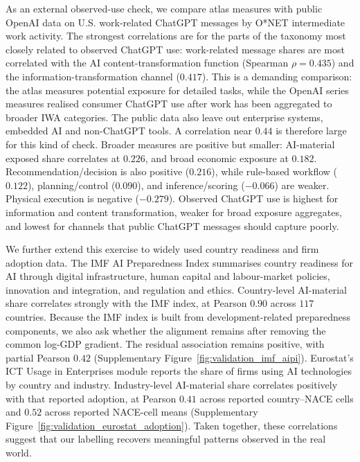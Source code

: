 \documentclass[11pt]{article}
\begin{document}
As an external observed-use check, we compare atlas measures with public OpenAI data on U.S. work-related ChatGPT messages by O*NET intermediate work activity. The strongest correlations are for the parts of the taxonomy most closely related to observed ChatGPT use: work-related message shares are most correlated with the AI content-transformation function (Spearman $\rho=0.435$) and the information-transformation channel ($0.417$). This is a demanding comparison: the atlas measures potential exposure for detailed tasks, while the OpenAI series measures realised consumer ChatGPT use after work has been aggregated to broader IWA categories. The public data also leave out enterprise systems, embedded AI and non-ChatGPT tools. A correlation near $0.44$ is therefore large for this kind of check. Broader measures are positive but smaller: AI-material exposed share correlates at $0.226$, and broad economic exposure at $0.182$. Recommendation/decision is also positive ($0.216$), while rule-based workflow ($0.122$), planning/control ($0.090$), and inference/scoring ($-0.066$) are weaker. Physical execution is negative ($-0.279$). Observed ChatGPT use is highest for information and content transformation, weaker for broad exposure aggregates, and lowest for channels that public ChatGPT messages should capture poorly.

We further extend this exercise to widely used country readiness and firm adoption data. The IMF AI Preparedness Index summarises country readiness for AI through digital infrastructure, human capital and labour-market policies, innovation and integration, and regulation and ethics. Country-level AI-material share correlates strongly with the IMF index, at Pearson $0.90$ across $117$ countries. Because the IMF index is built from development-related preparedness components, we also ask whether the alignment remains after removing the common log-GDP gradient. The residual association remains positive, with partial Pearson $0.42$ (Supplementary Figure~\ref{fig:validation_imf_aipi}). Eurostat's ICT Usage in Enterprises module reports the share of firms using AI technologies by country and industry. Industry-level AI-material share correlates positively with that reported adoption, at Pearson $0.41$ across reported country--NACE cells and $0.52$ across reported NACE-cell means (Supplementary Figure~\ref{fig:validation_eurostat_adoption}). Taken together, these correlations suggest that our labelling recovers meaningful patterns observed in the real world.
\end{document}
